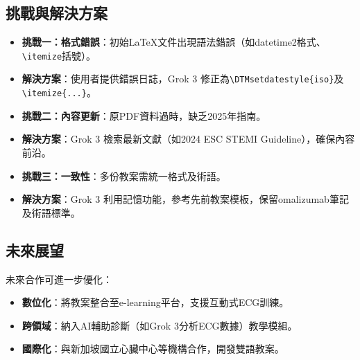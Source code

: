 \documentclass[12pt,a4paper]{article}
\begin{document}
\subsection{挑戰與解決方案}
\begin{itemize}[nosep]
    \item \textbf{挑戰一：格式錯誤}：初始LaTeX文件出現語法錯誤（如datetime2格式、\verb|\itemize|括號）。
    \item \textbf{解決方案}：使用者提供錯誤日誌，Grok 3 修正為\verb|\DTMsetdatestyle{iso}|及\verb|\itemize{...}|。
    \item \textbf{挑戰二：內容更新}：原PDF資料過時，缺乏2025年指南。
    \item \textbf{解決方案}：Grok 3 檢索最新文獻（如2024 ESC STEMI Guideline），確保內容前沿。
    \item \textbf{挑戰三：一致性}：多份教案需統一格式及術語。
    \item \textbf{解決方案}：Grok 3 利用記憶功能，參考先前教案模板，保留omalizumab筆記及術語標準。
\end{itemize}

\subsection{未來展望}
未來合作可進一步優化：
\begin{itemize}[nosep]
    \item \textbf{數位化}：將教案整合至e-learning平台，支援互動式ECG訓練。
    \item \textbf{跨領域}：納入AI輔助診斷（如Grok 3分析ECG數據）教學模組。
    \item \textbf{國際化}：與新加坡國立心臟中心等機構合作，開發雙語教案。
\end{itemize}


\clearpage
\end{document}
